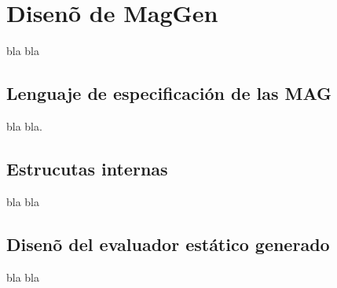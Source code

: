 \chapter{Disen\~o de MagGen}
\label{chap:disen_}
\minitoc


bla bla

\section{Lenguaje de especificaci\'on de las MAG}

bla bla.


\section{Estrucutas internas}
bla bla

\section{Disen\~o del evaluador est\'atico generado}

bla bla